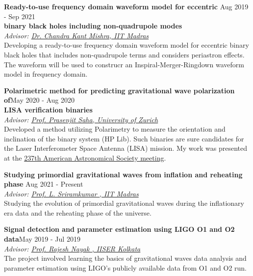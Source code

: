 \documentclass[margin, centered]{res}
\begin{document}
\begin{resume}
\textbf{Ready-to-use frequency domain waveform model for eccentric } \hfill Aug 2019 - Sep 2021 \\ \textbf{binary black holes including non-quadrupole modes}  \\ 
\emph{Advisor: \href{https://physics.iitm.ac.in/ckm}{Dr. Chandra Kant Mishra, IIT Madras}}
\vspace{0.1 cm}\\
Developing a ready-to-use frequency domain waveform model for eccentric binary black holes that includes non-quadrupole terms and considers periastron effects. The waveform will be used to
construcr an Inspiral-Merger-Ringdown waveform model in frequency domain.


\textbf{Polarimetric method for predicting gravitational wave polarization of}\hfill May 2020 - Aug 2020 \\ \textbf{LISA verification binaries}\\
\emph{Advisor: \href{https://www.ctac.uzh.ch/en/Research/research-groups/Prasenjit-Saha.html}{Prof. Prasenjit Saha, University of Zurich} }
\vspace{0.1 cm}\\
Developed a method utilizing Polarimetry to measure the orientation and inclination of the binary system (HP Lib). Such binaries are sure candidates for the  Laser Interferometer Space Antenna (LISA) mission.
My work was presented at the \href{https://aas.org/meetings/aas237}{\color{C2}237th American Astronomical Society meeting}.


\textbf{Studying primordial gravitational waves from inflation and reheating phase} \hfill Aug 2021 - Present \\
\emph{Advisor: \href{https://physics.iitm.ac.in/~sriram/index.html}{Prof. L. Sriramkumar , IIT Madras}}
\vspace{0.1 cm}\\
Studying the evolution of primordial gravitational waves during the inflationary era data and the reheating phase of the universe. 






\textbf{Signal detection and parameter estimation using LIGO O1 and O2 data}\hfill May 2019 - Jul 2019 \\
\emph{Advisor: \href{https://www.iiserkol.ac.in/~rajesh/}{Prof. Rajesh Nayak , IISER Kolkata}}
\vspace{0.1 cm}\\
The project involved learning the basics of gravitational waves data analysis and parameter estimation using LIGO's publicly available data from O1 and O2 run.





\end{resume}
\end{document}
